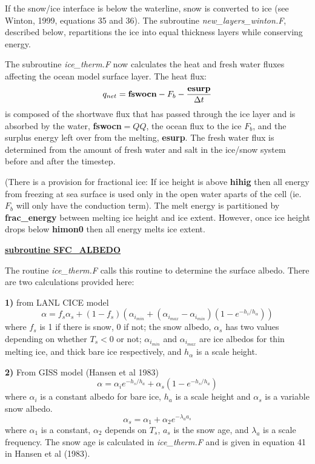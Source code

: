 If the snow/ice interface is below the waterline, snow is converted
to ice (see Winton, 1999, equations 35 and 36). The subroutine
{\it new\_layers\_winton.F}, described below, repartitions the ice into
equal thickness layers while conserving energy.

The subroutine {\it ice\_therm.F} now calculates the heat and fresh
water fluxes affecting the ocean model surface layer. The heat flux:
\[
q_{net}= {\bf fswocn} - F_{b} - \frac{{\bf esurp}}{\Delta t}
\]
is composed of the shortwave flux that has passed through the
ice layer and is absorbed by the water, {\bf fswocn}$=QQ$,
the ocean flux to the ice $F_b$,
and the surplus energy left over from the melting, {\bf esurp}.
The fresh water flux is determined from the amount of
fresh water and salt in the ice/snow system before and after the
timestep.

\noindent
{\tiny (There is a provision for fractional ice:
If ice height is above {\bf hihig} then all energy from freezing at
sea surface is used only in the open water aparts of the cell (ie.
$F_b$ will only have the conduction term).
The melt energy is partitioned by {\bf frac\_energy} between melting
ice height and ice extent. However, once ice height drops below
{\bf himon0} then all energy melts ice extent.}

\vspace{1cm}

\noindent
{\bf {\underline{subroutine SFC\_ALBEDO} } }

\noindent
The routine {\it ice\_therm.F} calls this routine to determine
the surface albedo. There are two calculations provided here:

\noindent
{\bf 1)} from LANL CICE model
\[ \alpha = f_s \alpha_s + (1-f_s) (\alpha_{i_{min}}
         + (\alpha_{i_{max}}- \alpha_{i_{min}}) (1-e^{-h_i/h_{\alpha}}))
\]
where $f_s$ is 1 if there is snow, 0 if not; the snow albedo, 
$\alpha_s$ has two values
depending on whether $T_s<0$ or not; $\alpha_{i_{min}}$ and 
$\alpha_{i_{max}}$ are ice albedos for thin melting ice, and
thick bare ice respectively, and $h_{\alpha}$ is a scale
height.

\noindent
{\bf 2)} From GISS model (Hansen et al 1983)
\[
 \alpha = \alpha_i e^{-h_s/h_a} + \alpha_s (1-e^{-h_s/h_a})
\]
where $\alpha_i$ is a constant albedo for bare ice, $h_a$
is a scale height and $\alpha_s$ is a variable snow albedo.
\[
\alpha_s = \alpha_1 + \alpha_2 e^{-\lambda_a a_s}
\]
where $\alpha_1$ is a constant, $\alpha_2$ depends on $T_s$,
$a_s$ is the snow age, and $\lambda_a$ is a scale frequency.
The snow age is calculated in {\it ice\_therm.F} and is given
in equation 41 in Hansen et al (1983).

